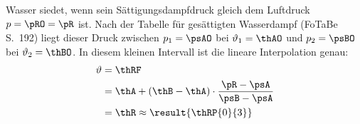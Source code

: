 Wasser siedet, wenn sein Sättigungsdampfdruck gleich dem Luftdruck $p = \pRO = \pR$ ist. Nach der Tabelle für gesättigten Wasserdampf (FoTaBe S.~192) liegt dieser Druck zwischen $p_1 = \psAO$ bei $\vartheta_1 = \thAO$ und $p_2 = \psBO$ bei $\vartheta_2 = \thBO$. In diesem kleinen Intervall ist die lineare Interpolation genau:
\begin{align}
 \vartheta &= \thRF \\
   &= \thA + \left(\thB-\thA\right)\cdot\frac{\pR-\psA}{\psB-\psA} \\
   &= \thR \approx \result{\thRP{0}{3}}
\end{align}
